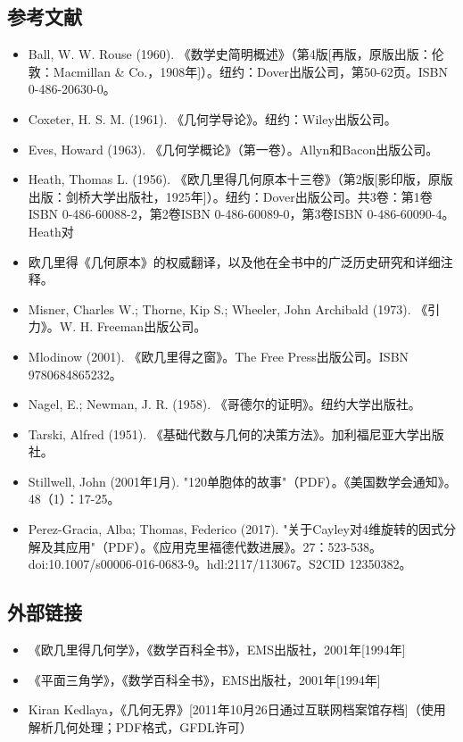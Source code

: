 \subsection{参考文献}  
\begin{itemize}
\item Ball, W. W. Rouse (1960). 《数学史简明概述》（第4版[再版，原版出版：伦敦：Macmillan & Co.，1908年]）。纽约：Dover出版公司，第50-62页。ISBN 0-486-20630-0。  
\item Coxeter, H. S. M. (1961). 《几何学导论》。纽约：Wiley出版公司。  
\item Eves, Howard (1963). 《几何学概论》（第一卷）。Allyn和Bacon出版公司。  
\item Heath, Thomas L. (1956). 《欧几里得几何原本十三卷》（第2版[影印版，原版出版：剑桥大学出版社，1925年]）。纽约：Dover出版公司。共3卷：第1卷ISBN 0-486-60088-2，第2卷ISBN 0-486-60089-0，第3卷ISBN 0-486-60090-4。Heath对\item 欧几里得《几何原本》的权威翻译，以及他在全书中的广泛历史研究和详细注释。  
\item Misner, Charles W.; Thorne, Kip S.; Wheeler, John Archibald (1973). 《引力》。W. H. Freeman出版公司。  
\item Mlodinow (2001). 《欧几里得之窗》。The Free Press出版公司。ISBN 9780684865232。  
\item Nagel, E.; Newman, J. R. (1958). 《哥德尔的证明》。纽约大学出版社。  
\item Tarski, Alfred (1951). 《基础代数与几何的决策方法》。加利福尼亚大学出版社。  
\item Stillwell, John (2001年1月). "120单胞体的故事"（PDF）。《美国数学会通知》。48（1）：17-25。  
\item Perez-Gracia, Alba; Thomas, Federico (2017). "关于Cayley对4维旋转的因式分解及其应用"（PDF）。《应用克里福德代数进展》。27：523-538。doi:10.1007/s00006-016-0683-9。hdl:2117/113067。S2CID 12350382。
\end{itemize}
\subsection{外部链接}
\begin{itemize}
\item 《欧几里得几何学》，《数学百科全书》，EMS出版社，2001年[1994年]  
\item 《平面三角学》，《数学百科全书》，EMS出版社，2001年[1994年]  
\item Kiran Kedlaya，《几何无界》[2011年10月26日通过互联网档案馆存档]（使用解析几何处理；PDF格式，GFDL许可）
\end{itemize}
